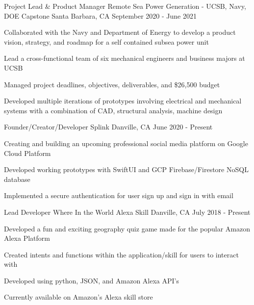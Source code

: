 

\begin{cventries}
   \cventry
  {Project Lead \& Product Manager} %
  {Remote Sea Power Generation - UCSB, Navy, DOE Capstone} %
  {Santa Barbara, CA} %
  {September 2020 - June 2021} %
  {
  \begin{cvitems} %
	\item {Collaborated with the Navy and Department of Energy to develop a product vision, strategy, and roadmap for a self contained subsea power unit }
	\item {Lead a cross-functional team of six mechanical engineers and business majors at UCSB}
	\item {Managed project deadlines, objectives, deliverables, and \$26,500 budget}
	\item {Developed multiple iterations of prototypes involving electrical and mechanical systems with a combination of CAD, structural analysis, machine design }
  \end{cvitems}
  }

   \cventry
  {Founder/Creator/Developer} %
  {Splink} %
  {Danville, CA} %
  {June 2020 - Present} %
  {
  \begin{cvitems} %
	\item {Creating and building an upcoming professional social media platform on Google Cloud Platform}
	\item {Developed working prototypes with SwiftUI and GCP Firebase/Firestore NoSQL database}
	\item {Implemented a secure authentication for user sign up and sign in with email}
  \end{cvitems}
  }

  \cventry
  {Lead Developer} %
  {Where In the World Alexa Skill} %
  {Danville, CA} %
  {July 2018 - Present} %
  {
  \begin{cvitems} %
	\item {Developed a fun and exciting geography quiz game made for the popular Amazon Alexa Platform}
	\item {Created intents and functions within the application/skill for users to interact with}
	\item {Developed using python, JSON, and Amazon Alexa API’s }
	\item {Currently available on Amazon’s Alexa skill store}
  \end{cvitems}
  }


\end{cventries}
